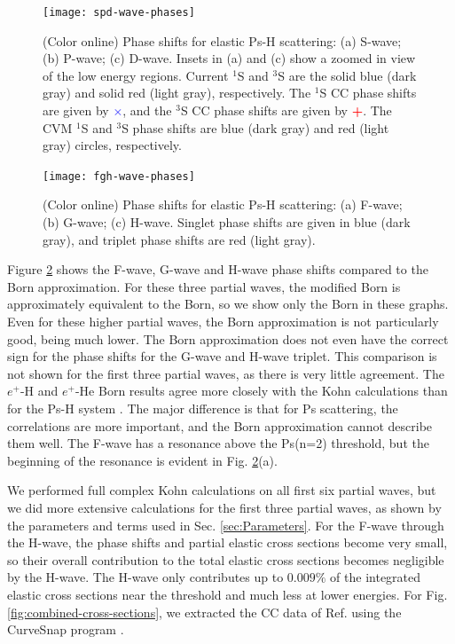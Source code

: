 \documentclass[preprint,showpacs,preprintnumbers,amsmath,amssymb,longbibliography,pra,aps]{revtex4-1}
\begin{document}
\begin{figure}[H]
	\centering
	\texttt{[image: spd-wave-phases]}
	\caption{(Color online) Phase shifts for elastic Ps-H scattering: (a) S-wave; (b) P-wave; (c) D-wave. Insets in (a) and (c) show a zoomed in view of the low energy regions. Current $^1$S and $^3$S are the solid blue (dark gray) and solid red (light gray), respectively. The $^1$S CC phase shifts \cite{Walters2004} are given by \mbox{\textcolor{blue}{$\times$}}, and the $^3$S CC phase shifts \cite{Blackwood2002} are given by \mbox{\textcolor{red}{\textbf{+}}}. The CVM $^1$S and $^3$S phase shifts \cite{Zhang2012} are blue (dark gray) and red (light gray) circles, respectively.}
	\label{fig:spd-wave-phases}
\end{figure}

\begin{figure}[H]
	\centering
	\texttt{[image: fgh-wave-phases]}
	\caption{(Color online) Phase shifts for elastic Ps-H scattering: (a) F-wave; (b) G-wave; (c) H-wave. Singlet phase shifts are given in blue (dark gray), and triplet phase shifts are red (light gray).}
	\label{fig:fgh-wave-phases}
\end{figure}

Figure \ref{fig:fgh-wave-phases} shows the F-wave, G-wave and H-wave phase shifts compared to the Born approximation. For these three partial waves, the modified Born is approximately equivalent to the Born, so we show only the Born in these graphs. Even for these higher partial waves, the Born approximation is not particularly good, being much lower. The Born approximation does not even have the correct sign for the phase shifts for the G-wave and H-wave triplet. This comparison is not shown for the first three partial waves, as there is very little agreement. The $e^+$-H and $e^+$-He Born results agree more closely with the Kohn calculations than for the Ps-H system \cite{VanReeth2014}. The major difference is that for Ps scattering, the correlations are more important, and the Born approximation cannot describe them well. The F-wave has a resonance above the Ps(n=2) threshold, but the beginning of the resonance is evident in Fig. \ref{fig:fgh-wave-phases}(a).

We performed full complex Kohn calculations on all first six partial waves, but we did more extensive calculations for the first three partial waves, as shown by the parameters and terms used in Sec. \ref{sec:Parameters}. For the F-wave through the H-wave, the phase shifts and partial elastic cross sections become very small, so their overall contribution to the total elastic cross sections becomes negligible by the H-wave. The H-wave only contributes up to $0.009\%$ of the integrated elastic cross sections near the threshold and much less at lower energies. For Fig. \ref{fig:combined-cross-sections}, we extracted the CC data of Ref. \cite{Walters2004} using the CurveSnap program \cite{CurveSnap}.
\end{document}

